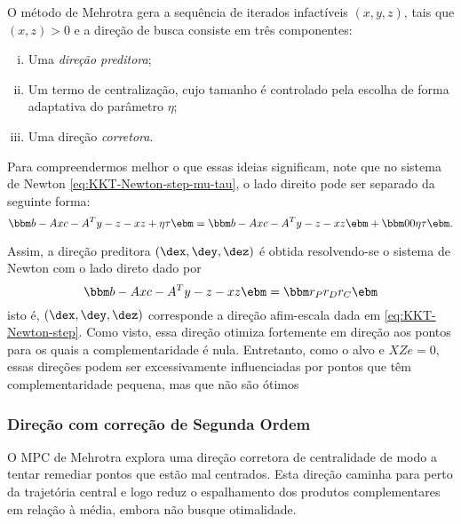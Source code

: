 O método de Mehrotra gera a sequência de iterados infactíveis
$(x,y,z)$, tais que $(x,z)>0$ e a direção de busca consiste em três componentes:
\begin{enumerate}[(i)]
  \item Uma  \emph{direção preditora}; 
  
  \item Um termo de centralização,
  cujo tamanho é controlado pela escolha de forma adaptativa do parâmetro $\eta$;
   \item Uma direção  \emph{corretora}.
\end{enumerate}




Para compreendermos melhor o que essas ideias significam, note que no sistema de
Newton \eqref{eq:KKT-Newton-step-mu-tau}, o lado direito pode ser separado da seguinte forma:
\[
\bbm b-Ax \\ c - A^Ty - z \\ -xz + \eta\tau \ebm = 
 \bbm b-Ax \\ c - A^Ty - z \\ -xz  \ebm +  \bbm 0 \\ 0 \\ 
 \eta\tau \ebm.
 \] 


Assim, a direção preditora $(\dex, \dey, \dez)$ é obtida resolvendo-se o
sistema de Newton com o lado direto dado por
 \begin{equation}
 \label{eq:afinne-scale-step}
 \bbm b-Ax\\ c - A^Ty - z \\ -xz  \ebm =  \bbm r_P\\ r_D \\ r_C  \ebm 
 \end{equation} 
 isto é,  $(\dex, \dey, \dez)$  corresponde a direção afim-escala dada em
\eqref{eq:KKT-Newton-step}. Como visto, essa direção otimiza fortemente em
direção aos pontos para os quais a complementaridade é nula. Entretanto, como o
alvo e $XZe = 0$, essas direções podem ser excessivamente influenciadas por
pontos que têm complementaridade pequena, mas que não são ótimos




\subsubsection{Direção com correção de Segunda Ordem}

O \ac{MPC} de Mehrotra explora uma direção corretora de centralidade de modo a
tentar remediar pontos que estão mal centrados. Esta direção caminha para
perto da trajetória central e logo reduz o espalhamento dos produtos
complementares em relação à média, embora não busque otimalidade.

